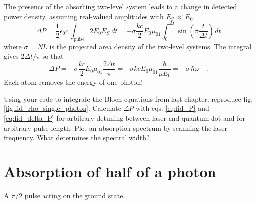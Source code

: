 The presence of the absorbing two-level system leads to a change in detected power density, assuming real-valued amplitudes with $E_S \ll E_0$
\begin{equation}
 \Delta P = \frac{1}{2} \epsilon_0 c \,  
\int_\text{pulse} 2 E_0 E_S  \ dt
  =-   \sigma \frac{k c }{2}  E_0 \mu_{01}  \int_0^{\Delta t}   \sin \left( \pi \frac{t}{\Delta t} \right)  \,  dt  \label{eq:fid_delta_P}
\end{equation}
where $\sigma = N L $ is the projected area density of the two-level systems. The integral gives $2 \Delta t/\pi$ so that
\begin{equation}
 \Delta P =-  \sigma \frac{k c}{2}  E_0 \mu_{01} \frac{2 \Delta t}{\pi}
= -  \sigma k c   E_0 \mu_{01}  \frac{\hbar}{\mu E_0} 
= -  \sigma \,  \hbar \omega   \quad .
\end{equation}
Each atom removes the energy of one photon!


\begin{questions}
\item Using your code to integrate the Bloch equations from last chapter, reproduce fig. \ref{fig:fid_rho_single_photon}. Calculate $\Delta P$  with eqs. \ref{eq:fid_P} and \ref{eq:fid_delta_P} for arbitrary detuning between laser and quantum dot and for arbitrary pulse length. Plot an absorption spectrum by scanning the laser frequency. What determines the spectral width?
\end{questions}



\section{Absorption of half of a photon}

\begin{marginfigure}

\caption{A  $\pi/2$ pulse acting on the ground state.}
\end{marginfigure}

